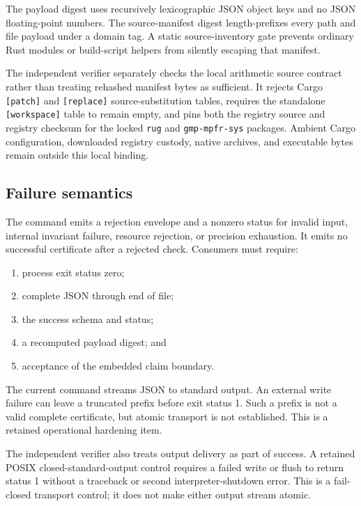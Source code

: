 \documentclass[11pt]{article}
\theoremstyle{definition}
\begin{document}
The payload digest uses recursively lexicographic JSON object keys and no JSON floating-point
numbers.  The source-manifest digest length-prefixes every path and file payload under a domain
tag.  A static source-inventory gate prevents ordinary Rust modules or build-script helpers from
silently escaping that manifest.

The independent verifier separately checks the local arithmetic source contract rather than
treating rehashed manifest bytes as sufficient.  It rejects Cargo \texttt{[patch]} and
\texttt{[replace]} source-substitution tables, requires the standalone \texttt{[workspace]} table
to remain empty, and pins both the registry source and registry checksum for the locked
\texttt{rug} and \texttt{gmp-mpfr-sys} packages.  Ambient Cargo configuration, downloaded
registry custody, native archives, and executable bytes remain outside this local binding.

\subsection{Failure semantics}

The command emits a rejection envelope and a nonzero status for invalid input, internal invariant
failure, resource rejection, or precision exhaustion.  It emits no successful certificate after
a rejected check.  Consumers must require:
\begin{enumerate}[leftmargin=*]
  \item process exit status zero;
  \item complete JSON through end of file;
  \item the success schema and status;
  \item a recomputed payload digest; and
  \item acceptance of the embedded claim boundary.
\end{enumerate}

The current command streams JSON to standard output.  An external write failure can leave a
truncated prefix before exit status 1.  Such a prefix is not a valid complete certificate, but
atomic transport is not established.  This is a retained operational hardening item.

The independent verifier also treats output delivery as part of success.  A retained POSIX
closed-standard-output control requires a failed write or flush to return status 1 without a
traceback or second interpreter-shutdown error.  This is a fail-closed transport control; it does
not make either output stream atomic.
\end{document}
